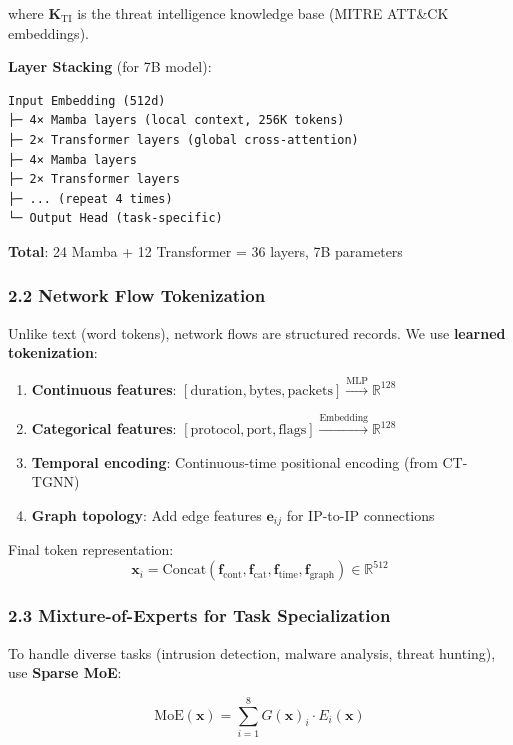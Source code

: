\documentclass[11pt]{article}
\begin{document}
where $\mathbf{K}_{\text{TI}}$ is the threat intelligence knowledge base (MITRE ATT\&CK embeddings).

\textbf{Layer Stacking} (for 7B model):
\begin{verbatim}
Input Embedding (512d)
├─ 4× Mamba layers (local context, 256K tokens)
├─ 2× Transformer layers (global cross-attention)
├─ 4× Mamba layers
├─ 2× Transformer layers
├─ ... (repeat 4 times)
└─ Output Head (task-specific)
\end{verbatim}

\textbf{Total}: 24 Mamba + 12 Transformer = 36 layers, 7B parameters

\subsubsection{2.2 Network Flow Tokenization}

Unlike text (word tokens), network flows are structured records. We use \textbf{learned tokenization}:

\begin{enumerate}
    \item \textbf{Continuous features}: $[\text{duration}, \text{bytes}, \text{packets}] \xrightarrow{\text{MLP}} \mathbb{R}^{128}$
    \item \textbf{Categorical features}: $[\text{protocol}, \text{port}, \text{flags}] \xrightarrow{\text{Embedding}} \mathbb{R}^{128}$
    \item \textbf{Temporal encoding}: Continuous-time positional encoding (from CT-TGNN)
    \item \textbf{Graph topology}: Add edge features $\mathbf{e}_{ij}$ for IP-to-IP connections
\end{enumerate}

Final token representation:
\begin{equation}
\mathbf{x}_i = \text{Concat}(\mathbf{f}_{\text{cont}}, \mathbf{f}_{\text{cat}}, \mathbf{f}_{\text{time}}, \mathbf{f}_{\text{graph}}) \in \mathbb{R}^{512}
\end{equation}

\subsubsection{2.3 Mixture-of-Experts for Task Specialization}

To handle diverse tasks (intrusion detection, malware analysis, threat hunting), use \textbf{Sparse MoE}:

\begin{equation}
\text{MoE}(\mathbf{x}) = \sum_{i=1}^{8} G(\mathbf{x})_i \cdot E_i(\mathbf{x})
\end{equation}
\end{document}
